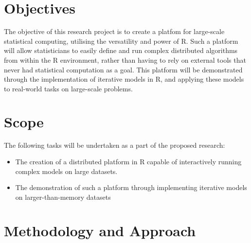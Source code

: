 \documentclass[a4paper,10pt]{article}
\begin{document}
\section{Objectives}

 The objective of this research project is to create a platfom for large-scale
 statistical computing, utilising the versatility and power of R.
 Such a platform will allow statisticians to easily define and run complex
 distributed algorithms from within the R environment, rather than having to
 rely on external tools that never had statistical computation as a goal.
 This platform will be demonstrated through the implementation of iterative
 models in R, and applying these models to real-world tasks on large-scale
 problems.

\section{Scope}
The following tasks will be undertaken as a part of the proposed research:

\begin{itemize}
	\item The creation of a distributed platform in R capable of
		interactively running complex models on large datasets.
	\item The demonstration of such a platform through implementing
		iterative models on larger-than-memory datasets
\end{itemize}

\section{Methodology and Approach}
\end{document}
